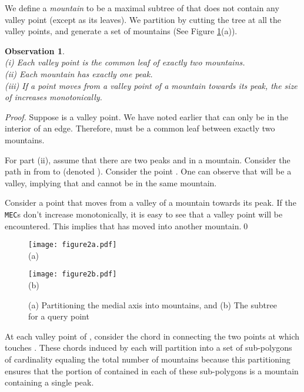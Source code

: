 \documentclass[12pt]{llncs}
\newtheorem{observation}{Observation}
\begin{document}
We define a {\em mountain} to be a maximal subtree of 
 that does not contain any valley point (except as its leaves). 
We partition  by cutting the tree at all the valley 
points, and generate a set of mountains  
(See Figure \ref{fig:MedialAxisPartitioning}(a)). 
\begin{observation} \label{o} ~\\
(i) Each valley point is the common leaf of exactly two mountains.\\
(ii) Each mountain has exactly one peak.\\
(iii) If a point  moves from a valley point of a 
mountain towards its peak, the size of  increases monotonically.  
\end{observation}
\begin{proof}
Suppose  is a valley point. We have noted earlier that  can only be in 
the interior of an edge. Therefore,  must be a common leaf between exactly two mountains.

For part (ii), assume that there are two peaks  and  in a mountain. Consider the path in  from  to  (denoted ). Consider the point .  One can observe that  will be a valley, implying that  and  cannot be in the same mountain.

 Consider a point  that moves from a valley  of a 
mountain towards its peak. If the {\tt MEC}s don't increase monotonically, 
it is easy to see that a valley point will be encountered. This
implies that  has moved into another mountain.\qed
\end{proof}
\begin{figure}[h]
\begin{minipage}[c]{0.5\textwidth}
\begin{center} \texttt{[image: figure2a.pdf]}\\
(a)  
\end{center}
\end{minipage}\begin{minipage}[c]{0.5\textwidth}
\begin{center} \texttt{[image: figure2b.pdf]}\\
(b)  
\end{center}
\end{minipage}
\caption{(a) Partitioning the medial axis 
 into mountains, and (b) The subtree  for a query point }
\label{fig:MedialAxisPartitioning}
\end{figure}

At each valley point  of , consider the chord in  connecting the two points 
at which  touches . These chords induced by each  will 
partition  into  a set of sub-polygons  of 
cardinality equaling the total number of mountains because this 
partitioning ensures that the portion of   contained in each of these sub-polygons 
is a 
mountain containing a single peak. 
\end{document}
